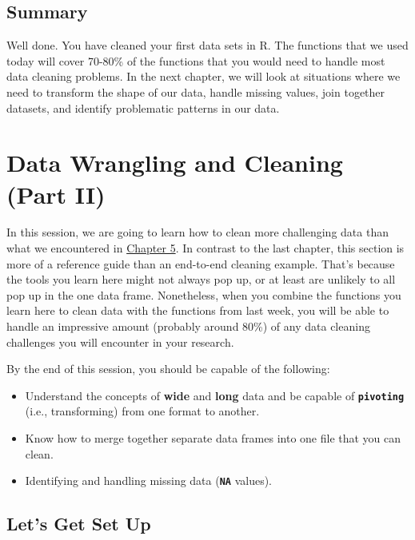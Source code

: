 \documentclass[
]{book}
\begin{document}
\hypertarget{summary-5}{%
\section{Summary}\label{summary-5}}

Well done. You have cleaned your first data sets in R. The functions that we used today will cover 70-80\% of the functions that you would need to handle most data cleaning problems. In the next chapter, we will look at situations where we need to transform the shape of our data, handle missing values, join together datasets, and identify problematic patterns in our data.

\hypertarget{datacleaning2}{%
\chapter{Data Wrangling and Cleaning (Part II)}\label{datacleaning2}}

In this session, we are going to learn how to clean more challenging data than what we encountered in \protect\hyperlink{datacleaning1}{Chapter 5}. In contrast to the last chapter, this section is more of a reference guide than an end-to-end cleaning example. That's because the tools you learn here might not always pop up, or at least are unlikely to all pop up in the one data frame. Nonetheless, when you combine the functions you learn here to clean data with the functions from last week, you will be able to handle an impressive amount (probably around 80\%) of any data cleaning challenges you will encounter in your research.

By the end of this session, you should be capable of the following:

\begin{itemize}
\item
  Understand the concepts of \textbf{wide} and \textbf{long} data and be capable of \textbf{\texttt{pivoting}} (i.e., transforming) from one format to another.
\item
  Know how to merge together separate data frames into one file that you can clean.
\item
  Identifying and handling missing data (\textbf{\texttt{NA}} values).
\end{itemize}

\hypertarget{lets-get-set-up-1}{%
\section{Let's Get Set Up}\label{lets-get-set-up-1}}
\end{document}
